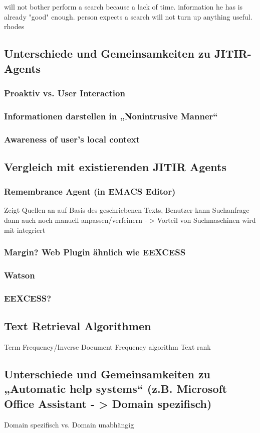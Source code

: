 will not bother perform a search because a lack of time. information he has is already "good" enough. person expects a search will not turn up anything useful. rhodes


\subsection{Unterschiede und Gemeinsamkeiten zu JITIR-Agents}
 \subsubsection{Proaktiv vs. User Interaction}
 \subsubsection{Informationen darstellen in „Nonintrusive Manner“}
 \subsubsection{Awareness of user's local context}
\subsection{Vergleich mit existierenden JITIR Agents}
 	\subsubsection{Remembrance Agent (in EMACS Editor)}
		Zeigt Quellen an auf Basis des geschriebenen Texts, Benutzer kann Suchanfrage dann auch noch manuell anpassen/verfeinern
		- > Vorteil von Suchmaschinen wird mit integriert
 	\subsubsection{Margin? Web Plugin ähnlich wie EEXCESS}
 	\subsubsection{Watson}
 	\subsubsection{EEXCESS?}
 	\subsection{Text Retrieval Algorithmen}
 		Term Frequency/Inverse Document Frequency algorithm
 		Text rank
 \subsection{Unterschiede und Gemeinsamkeiten zu „Automatic help systems“ (z.B. Microsoft Office Assistant - > Domain spezifisch)}
 	Domain spezifisch vs. Domain unabhängig